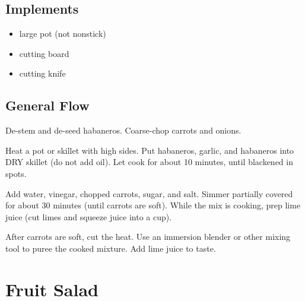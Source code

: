 \subsection{Implements} \begin{itemize}
    \item large pot (not nonstick)
    \item cutting board
    \item cutting knife
\end{itemize}

\subsection{General Flow} 

De-stem and de-seed habaneros. Coarse-chop carrots and onions.

Heat a pot or skillet with high sides. Put habaneros, garlic, and habaneros into DRY skillet (do not add oil). Let cook for about 10 minutes, until blackened in spots.

Add water, vinegar, chopped carrots, sugar, and salt. Simmer partially covered for about 30 minutes (until carrots are soft). While the mix is cooking, prep lime juice (cut limes and squeeze juice into a cup).

After carrots are soft, cut the heat. Use an immersion blender or other mixing tool to puree the cooked mixture. Add lime juice to taste.

\newpage \section{Fruit Salad}



